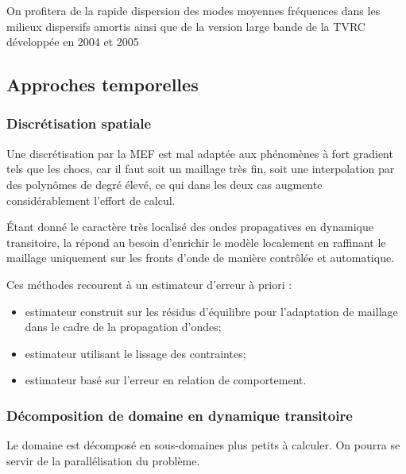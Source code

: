On profitera de la rapide dispersion des modes moyennes fréquences dans les milieux dispersifs amortis ainsi que de la version large bande de la TVRC développée en 2004 et 2005~\cite{Lit-Chevreuil}

\medskip
\subsection{Approches temporelles}

\subsubsection{Discrétisation spatiale}
Une discrétisation par la MEF est mal adaptée aux phénomènes à fort gradient tels
que les chocs, car il faut soit un maillage très fin, soit une interpolation par des polynômes
de degré élevé, ce qui dans les deux cas augmente considérablement l'effort de calcul.

Étant donné le caractère très localisé des ondes propagatives en dynamique transitoire,
la  répond au besoin d'enrichir le modèle
localement en raffinant le maillage uniquement sur les fronts d'onde de manière contrôlée et
automatique.

Ces méthodes recourent à un estimateur d'erreur à priori :
\begin{itemize}
	\item estimateur construit sur les résidus d'équilibre pour l'adaptation de
		maillage dans le cadre de la propagation d'ondes;
	\item estimateur utilisant le lissage des contraintes;
	\item estimateur basé sur l'erreur en relation de comportement.
\end{itemize}

\medskip
\subsubsection{Décomposition de domaine en dynamique transitoire}\label{Sec-Schur}

Le domaine est décomposé en sous-domaines plus petits à calculer.
On pourra se servir de la parallélisation du problème.

